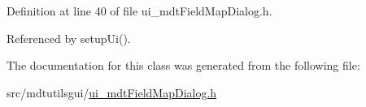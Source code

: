 Definition at line 40 of file ui\-\_\-mdt\-Field\-Map\-Dialog.\-h.



Referenced by setup\-Ui().



The documentation for this class was generated from the following file\-:\begin{DoxyCompactItemize}
\item 
src/mdtutilsgui/\hyperlink{ui__mdt_field_map_dialog_8h}{ui\-\_\-mdt\-Field\-Map\-Dialog.\-h}\end{DoxyCompactItemize}
